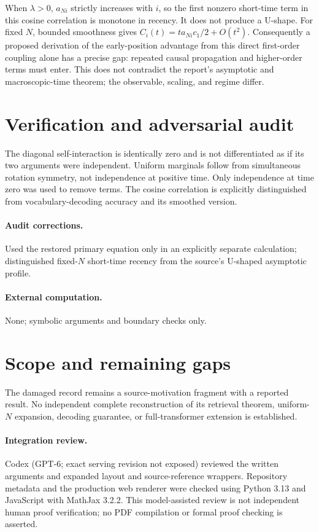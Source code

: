 \documentclass[11pt]{article}
\begin{document}
When $\lambda>0$, $a_{Ni}$ strictly increases with $i$, so the first nonzero short-time term in this cosine correlation is monotone in recency. It does not produce a U-shape. For fixed $N$, bounded smoothness gives $C_i(t)=t a_{Ni}c_1/2+O(t^2)$. Consequently a proposed derivation of the early-position advantage from this direct first-order coupling alone has a precise gap: repeated causal propagation and higher-order terms must enter. This does not contradict the report's asymptotic and macroscopic-time theorem; the observable, scaling, and regime differ.
\section{Verification and adversarial audit}
The diagonal self-interaction is identically zero and is not differentiated as if its two arguments were independent. Uniform marginals follow from simultaneous rotation symmetry, not independence at positive time. Only independence at time zero was used to remove terms. The cosine correlation is explicitly distinguished from vocabulary-decoding accuracy and its smoothed version.
\paragraph{Audit corrections.} Used the restored primary equation only in an explicitly separate calculation; distinguished fixed-$N$ short-time recency from the source's U-shaped asymptotic profile.
\paragraph{External computation.} None; symbolic arguments and boundary checks only.
\section{Scope and remaining gaps}
The damaged record remains a source-motivation fragment with a reported result. No independent complete reconstruction of its retrieval theorem, uniform-$N$ expansion, decoding guarantee, or full-transformer extension is established.
\paragraph{Integration review.} Codex (GPT-6; exact serving revision not exposed) reviewed the written arguments and expanded layout and source-reference wrappers. Repository metadata and the production web renderer were checked using Python 3.13 and JavaScript with MathJax 3.2.2. This model-assisted review is not independent human proof verification; no PDF compilation or formal proof checking is asserted.
\end{document}
